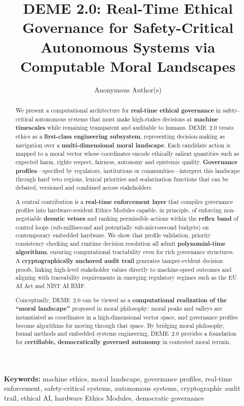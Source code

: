 \documentclass[11pt]{article}
\title{DEME 2.0: Real-Time Ethical Governance for Safety-Critical Autonomous Systems via Computable Moral Landscapes}
\author{Anonymous Author(s)}
\date{}
\begin{document}
\maketitle

\noindent\textbf{Keywords:} machine ethics, moral landscape, governance profiles, real-time enforcement, safety-critical systems, autonomous systems, cryptographic audit trail, ethical AI, hardware Ethics Modules, democratic governance

\begin{abstract}
We present a computational architecture for \textbf{real-time ethical governance} in safety-critical autonomous systems that must make high-stakes decisions at \textbf{machine timescales} while remaining transparent and auditable to humans. DEME~2.0 treats ethics as a \textbf{first-class engineering subsystem}, representing decision-making as navigation over a \textbf{multi-dimensional moral landscape}. Each candidate action is mapped to a moral vector whose coordinates encode ethically salient quantities such as expected harm, rights respect, fairness, autonomy and epistemic quality. \textbf{Governance profiles}---specified by regulators, institutions or communities---interpret this landscape through hard veto regions, lexical priorities and scalarization functions that can be debated, versioned and combined across stakeholders.

A central contribution is a \textbf{real-time enforcement layer} that compiles governance profiles into hardware-resident Ethics Modules capable, in principle, of enforcing non-negotiable \textbf{deontic vetoes} and ranking permissible actions within the \textbf{reflex band} of control loops (sub-millisecond and potentially sub-microsecond budgets) on contemporary embedded hardware. We show that profile validation, priority consistency checking and runtime decision resolution all admit \textbf{polynomial-time algorithms}, ensuring computational tractability even for rich governance structures. A \textbf{cryptographically anchored audit trail} generates tamper-evident decision proofs, linking high-level stakeholder values directly to machine-speed outcomes and aligning with traceability requirements in emerging regulatory regimes such as the EU AI Act and NIST AI RMF.

Conceptually, DEME~2.0 can be viewed as a \textbf{computational realization of the ``moral landscape''} proposed in moral philosophy: moral peaks and valleys are instantiated as coordinates in a high-dimensional vector space, and governance profiles become algorithms for moving through that space. By bridging moral philosophy, formal methods and embedded systems engineering, DEME~2.0 provides a foundation for \textbf{certifiable, democratically governed autonomy} in contested moral terrain.
\end{abstract}
\end{document}
